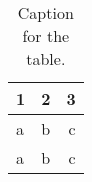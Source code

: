 \documentclass{article}
\begin{document}
\begin{table}[h!]
  \centering
  \caption{Caption for the table.}
  \label{tab:table1}
  \begin{tabular}{l|c||r}
    1 & 2 & 3\\
    \hline
    a & b & c\\
    a & b & c\\
  \end{tabular}
\end{table}
\end{document}
